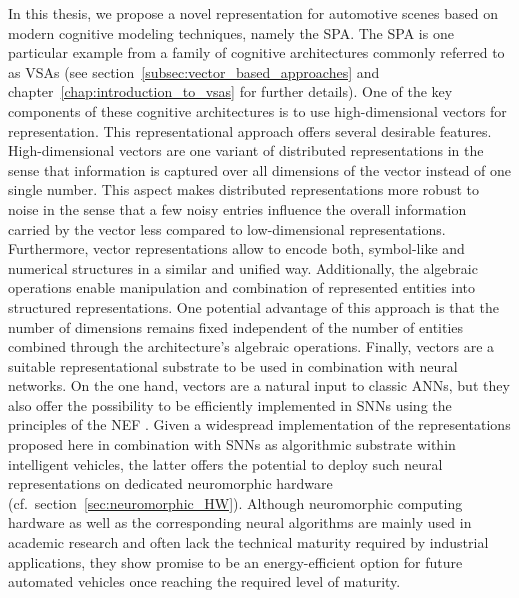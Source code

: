 In this thesis, we propose a novel representation for automotive scenes based on modern cognitive modeling techniques, namely the \ac{SPA}.
The \ac{SPA} is one particular example from a family of cognitive architectures commonly referred to as \acp{VSA} (see section~\ref{subsec:vector_based_approaches} and chapter~\ref{chap:introduction_to_vsas} for further details).
One of the key components of these cognitive architectures is to use high-dimensional vectors for representation.
This representational approach offers several desirable features.
High-dimensional vectors are one variant of distributed representations in the sense that information is captured over all dimensions of the vector instead of one single number.
This aspect makes distributed representations more robust to noise in the sense that a few noisy entries influence the overall information carried by the vector less compared to low-dimensional representations.
Furthermore, vector representations allow to encode both, symbol-like and numerical structures in a similar and unified way.
Additionally, the algebraic operations enable manipulation and combination of represented entities into structured representations.
One potential advantage of this approach is that the number of dimensions remains fixed independent of the number of entities combined through the architecture's algebraic operations.
Finally, vectors are a suitable representational substrate to be used in combination with neural networks.
On the one hand, vectors are a natural input to classic \acp{ANN}, but they also offer the possibility to be efficiently implemented in \acp{SNN} using the principles of the \ac{NEF} \parencite[see][but also section~\ref{subsec:implementation_in_snns}]{Eliasmith2013}.
Given a widespread implementation of the representations proposed here in combination with \acp{SNN} as algorithmic substrate within intelligent vehicles, the latter offers the potential to deploy such neural representations on dedicated neuromorphic hardware (cf.\ section~\ref{sec:neuromorphic_HW}).
Although neuromorphic computing hardware as well as the corresponding neural algorithms are mainly used in academic research and often lack the technical maturity required by industrial applications, they show promise to be an energy-efficient option for future automated vehicles once reaching the required level of maturity.

